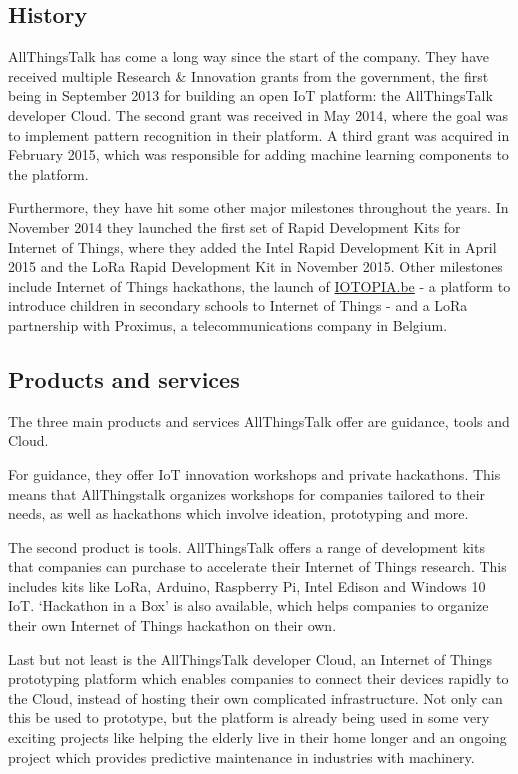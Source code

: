 \documentclass[pdftex,a4paper,12pt,twoside]{report}
\begin{document}
\subsection{History}
\label{subsec:atthistory}
AllThingsTalk has come a long way since the start of the company. They have received multiple Research \& Innovation grants from the government, the first being in September 2013 for building an open IoT platform: the AllThingsTalk developer Cloud. The second grant was received in May 2014, where the goal was to implement pattern recognition in their platform. A third grant was acquired in February 2015, which was responsible for adding machine learning components to the platform.

Furthermore, they have hit some other major milestones throughout the years. In November 2014 they launched the first set of Rapid Development Kits for Internet of Things, where they added the Intel Rapid Development Kit in April 2015 and the LoRa Rapid Development Kit in November 2015. Other milestones include Internet of Things hackathons, the launch of \url{IOTOPIA.be} - a platform to introduce children in secondary schools to Internet of Things - and a LoRa partnership with Proximus, a telecommunications company in Belgium.

\subsection{Products and services}
\label{subsec:attproductsservices}
The three main products and services AllThingsTalk offer are guidance, tools and Cloud. 

For guidance, they offer IoT innovation workshops and private hackathons. This means that AllThingstalk organizes workshops for companies tailored to their needs, as well as hackathons which involve ideation, prototyping and more.

The second product is tools. AllThingsTalk offers a range of development kits that companies can purchase to accelerate their Internet of Things research. This includes kits like LoRa, Arduino, Raspberry Pi, Intel Edison and Windows 10 IoT. `Hackathon in a Box' is also available, which helps companies to organize their own Internet of Things hackathon on their own.

Last but not least is the AllThingsTalk developer Cloud, an Internet of Things prototyping platform which enables companies to connect their devices rapidly to the Cloud, instead of hosting their own complicated infrastructure. Not only can this be used to prototype, but the platform is already being used in some very exciting projects like helping the elderly live in their home longer and an ongoing project which provides predictive maintenance in industries with machinery.
\end{document}
